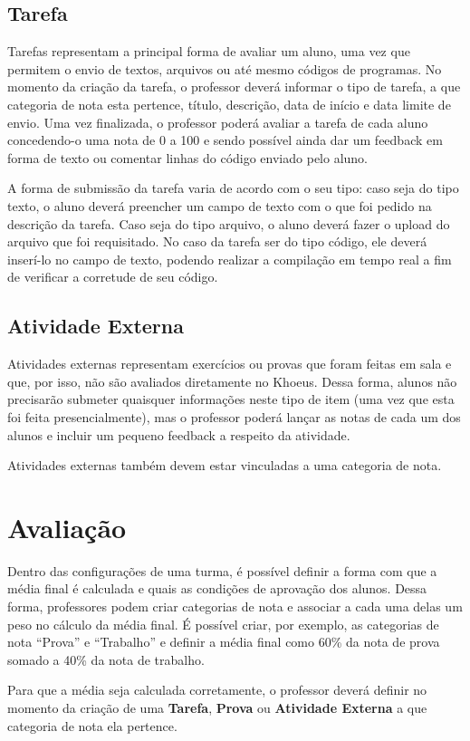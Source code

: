 \subsection{Tarefa}
\label{sec-minimundo:itens-board:tarefa}
Tarefas representam a principal forma de avaliar um aluno, uma vez que permitem o envio de textos, arquivos ou até mesmo códigos de programas. No momento da criação da tarefa, o professor deverá informar o tipo de tarefa, a que categoria de nota esta pertence, título, descrição, data de início e data limite de envio. Uma vez finalizada, o professor poderá avaliar a tarefa de cada aluno concedendo-o uma nota de 0 a 100 e sendo possível ainda dar um feedback em forma de texto ou comentar linhas do código enviado pelo aluno.

A forma de submissão da tarefa varia de acordo com o seu tipo: caso seja do tipo texto, o aluno deverá preencher um campo de texto com o que foi pedido na descrição da tarefa. Caso seja do tipo arquivo, o aluno deverá fazer o upload do arquivo que foi requisitado. No caso da tarefa ser do tipo código, ele deverá inserí-lo no campo de texto, podendo realizar a compilação em tempo real a fim de verificar a corretude de seu código. 

\subsection{Atividade Externa}
\label{sec-minimundo:itens-board:ativida-externa}
Atividades externas representam exercícios ou provas que foram feitas em sala e que, por isso, não são avaliados diretamente no Khoeus. Dessa forma, alunos não precisarão submeter quaisquer informações neste tipo de item (uma vez que esta foi feita presencialmente), mas o professor poderá lançar as notas de cada um dos alunos e incluir um pequeno feedback a respeito da atividade. 

Atividades externas também devem estar vinculadas a uma categoria de nota.

\section{Avaliação}
\label{sec-minimundo:avaliacao}
Dentro das configurações de uma turma, é possível definir a forma com que a média final é calculada e quais as condições de aprovação dos alunos. Dessa forma, professores podem criar categorias de nota e associar a cada uma delas um peso no cálculo da média final. É possível criar, por exemplo, as categorias de nota ``Prova'' e ``Trabalho'' e definir a média final como 60\% da nota de prova somado a 40\% da nota de trabalho.

Para que a média seja calculada corretamente, o professor deverá definir no momento da criação de uma \textbf{Tarefa}, \textbf{Prova} ou \textbf{Atividade Externa} a que categoria de nota ela pertence.

